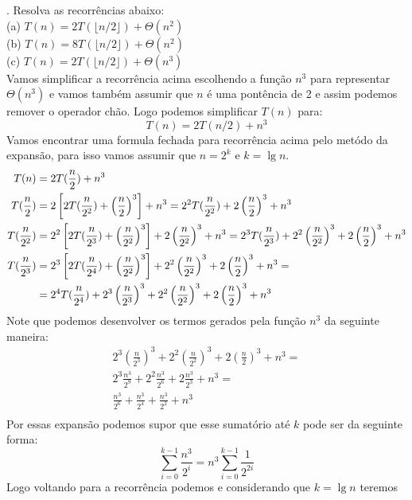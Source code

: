 . Resolva as recorrências abaixo: 
\\[6pt]
(a) $T(n) = 2T(\lfloor n/2 \rfloor) + \Theta(n^2)$ \\
(b) $T(n) = 8T(\lfloor n/2 \rfloor) + \Theta(n^2)$ \\
(c) $T(n) = 2T(\lfloor n/2 \rfloor) + \Theta(n^3)$ 
\\[6pt]
Vamos simplificar a recorrência acima escolhendo a função $n^3$ para representar $\Theta(n^3)$ e vamos também assumir que $n$ é uma pontência de 2 e assim podemos remover o operador chão. Logo podemos simplificar $T(n)$ para:
\[ T(n) = 2T(n/2) + n^3 \]
Vamos encontrar uma formula fechada para recorrência acima pelo metódo da expansão, para isso vamos assumir que $n = 2^k$ e $k = \lg n$.
\begin{align*}
 T(n) &= 2T(\frac{n}{2}) + n^3 \\
 T(\frac{n}{2}) &= 2 \left[ 2T(\frac{n}{2^2}) + \left( \frac{n}{2} \right)^3 \right] + n^3 = 2^2T(\frac{n}{2^2}) + 2 \left( \frac{n}{2} \right)^3 + n^3  \\
 T(\frac{n}{2^2}) &= 2^2 \left[ 2T(\frac{n}{2^3}) + \left( \frac{n}{2^2} \right)^3 \right] + 2 \left(\frac{n}{2^2} \right)^3 + n^3 = 2^3T(\frac{n}{2^3}) + 2^2 \left(\frac{n}{2^2} \right)^3 + 2 \left( \frac{n}{2} \right)^3 + n^3 \\
 T(\frac{n}{2^3}) &= 2^3 \left[ 2T(\frac{n}{2^4}) + \left( \frac{n}{2^2} \right)^3 \right] + 2^2 \left(\frac{n}{2^2} \right)^3 + 2 \left( \frac{n}{2} \right)^3 + n^3 = \\
 \hspace{5mm} &= 2^4T(\frac{n}{2^4}) + 2^3 \left( \frac{n}{2^3} \right)^3 + 2^2 \left(\frac{n}{2^2} \right)^3 + 2 \left( \frac{n}{2} \right)^3 + n^3  
\end{align*}
Note que podemos desenvolver os termos gerados pela função $n^3$ da seguinte maneira:
\begin{align*}
 2^3 \left( \frac{n}{2^3} \right)^3 + 2^2 \left(\frac{n}{2^2} \right)^3 + 2 \left( \frac{n}{2} \right)^3 + n^3 =\\
 2^3 \frac{n^3}{2^9} + 2^2 \frac{n^3}{2^6} + 2 \frac{n^3}{2^3} + n^3 =\\
 \frac{n^3}{2^6} + \frac{n^3}{2^4} + \frac{n^3}{2^2} + n^3  \\
\end{align*}
Por essas expansão podemos supor que esse sumatório até $k$ pode ser da seguinte forma:
\[ \sum_{i=0}^{k-1} \frac{n^3}{2^i} = n^3 \sum_{i=0}^{k-1} \frac{1}{2^{2i}} \]
Logo voltando para a recorrência podemos e considerando que $k = \lg n$ teremos
